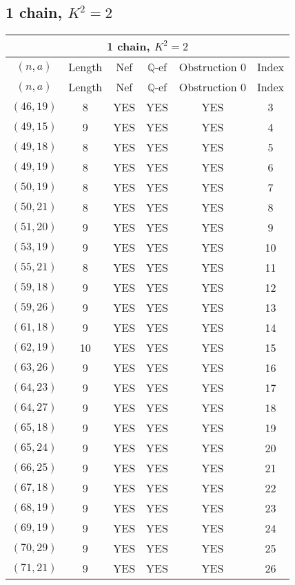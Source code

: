 \subsection{1 chain, $K^2 = 2$}
\begin{longtable}{|c|c|c|c|c|c|}
\hline
\multicolumn{6}{|c|}{1 chain, $K^2 = 2$}\\
\hline
$(n,a)$ & Length & Nef & $\mathbb Q$-ef & Obstruction 0 & Index\\
\hline
\endfirsthead

\hline
$(n,a)$ & Length & Nef & $\mathbb Q$-ef & Obstruction 0 & Index\\
\hline
\endhead
\hline
\endfoot

$(46, 19)$ & 8 & YES & YES & YES & 3\\
$(49, 15)$ & 9 & YES & YES & YES & 4\\
$(49, 18)$ & 8 & YES & YES & YES & 5\\
$(49, 19)$ & 8 & YES & YES & YES & 6\\
$(50, 19)$ & 8 & YES & YES & YES & 7\\
$(50, 21)$ & 8 & YES & YES & YES & 8\\
$(51, 20)$ & 9 & YES & YES & YES & 9\\
$(53, 19)$ & 9 & YES & YES & YES & 10\\
$(55, 21)$ & 8 & YES & YES & YES & 11\\
$(59, 18)$ & 9 & YES & YES & YES & 12\\
$(59, 26)$ & 9 & YES & YES & YES & 13\\
$(61, 18)$ & 9 & YES & YES & YES & 14\\
$(62, 19)$ & 10 & YES & YES & YES & 15\\
$(63, 26)$ & 9 & YES & YES & YES & 16\\
$(64, 23)$ & 9 & YES & YES & YES & 17\\
$(64, 27)$ & 9 & YES & YES & YES & 18\\
$(65, 18)$ & 9 & YES & YES & YES & 19\\
$(65, 24)$ & 9 & YES & YES & YES & 20\\
$(66, 25)$ & 9 & YES & YES & YES & 21\\
$(67, 18)$ & 9 & YES & YES & YES & 22\\
$(68, 19)$ & 9 & YES & YES & YES & 23\\
$(69, 19)$ & 9 & YES & YES & YES & 24\\
$(70, 29)$ & 9 & YES & YES & YES & 25\\
$(71, 21)$ & 9 & YES & YES & YES & 26\\

\end{longtable}
